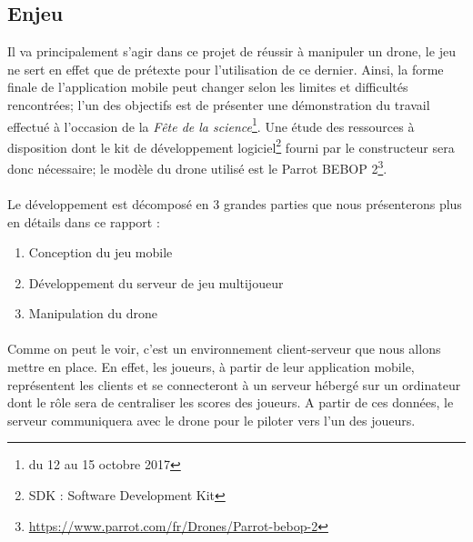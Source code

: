 \newpage
\subsection{Enjeu}
Il va principalement s'agir dans ce projet de réussir à manipuler un drone, le jeu ne sert en effet que de prétexte pour l'utilisation de ce dernier. Ainsi, la forme finale de l'application mobile peut changer selon les limites et difficultés rencontrées; l'un des objectifs est de présenter une démonstration du travail effectué à l'occasion de la \emph{Fête de la science}\footnote{du 12 au 15 octobre 2017}. Une étude des ressources à disposition dont le kit de développement logiciel\footnote{SDK : Software Development Kit} fourni par le constructeur sera donc nécessaire; le modèle du drone utilisé est le Parrot BEBOP 2\footnote{\url{https://www.parrot.com/fr/Drones/Parrot-bebop-2}}.

\paragraph{}
Le développement est décomposé en 3 grandes parties que nous présenterons plus en détails dans ce rapport :
\begin{enumerate}
\item Conception du jeu mobile
\item Développement du serveur de jeu multijoueur
\item Manipulation du drone
\end{enumerate}

\paragraph{}
Comme on peut le voir, c'est un environnement client-serveur que nous allons mettre en place. En effet, les joueurs, à partir de leur application mobile, représentent les clients et se connecteront à un serveur hébergé sur un ordinateur dont le rôle sera de centraliser les scores des joueurs. A partir de ces données, le serveur communiquera avec le drone pour le piloter vers l'un des joueurs. 